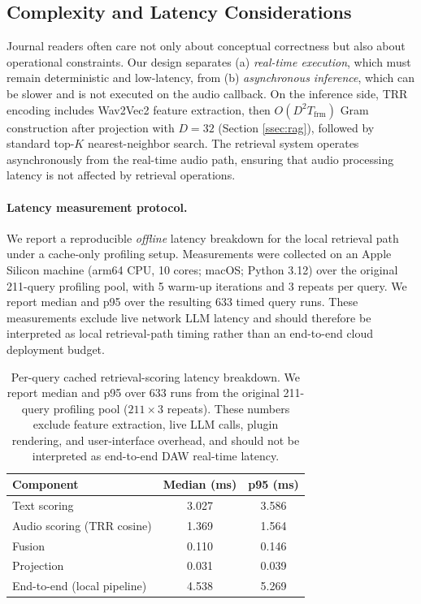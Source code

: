 \subsection{Complexity and Latency Considerations}
\label{ssec:complexity_latency}
Journal readers often care not only about conceptual correctness but also about operational constraints. Our design separates (a) \textit{real-time execution}, which must remain deterministic and low-latency, from (b) \textit{asynchronous inference}, which can be slower and is not executed on the audio callback.
On the inference side, TRR encoding includes Wav2Vec2 feature extraction, then $O(D^2 T_{\text{frm}})$ Gram construction after projection with $D=32$ (Section \ref{ssec:rag}), followed by standard top-$K$ nearest-neighbor search. The retrieval system operates asynchronously from the real-time audio path, ensuring that audio processing latency is not affected by retrieval operations.

\paragraph{Latency measurement protocol.}
We report a reproducible \emph{offline} latency breakdown for the local retrieval path under a cache-only profiling setup. Measurements were collected on an Apple Silicon machine (arm64 CPU, 10 cores; macOS; Python 3.12) over the original 211-query profiling pool, with 5 warm-up iterations and 3 repeats per query. We report median and p95 over the resulting 633 timed query runs. These measurements exclude live network LLM latency and should therefore be interpreted as local retrieval-path timing rather than an end-to-end cloud deployment budget.

\begin{table}[t]
	\centering
\caption{Per-query cached retrieval-scoring latency breakdown. We report median and p95 over 633 runs from the original 211-query profiling pool ($211\times 3$ repeats). These numbers exclude feature extraction, live LLM calls, plugin rendering, and user-interface overhead, and should not be interpreted as end-to-end DAW real-time latency.}
	\label{tab:latency_breakdown}
	\begin{tabular}{lcc}
		\toprule
		\textbf{Component} & \textbf{Median (ms)} & \textbf{p95 (ms)} \\
		\midrule
		Text scoring & 3.027 & 3.586 \\
		Audio scoring (TRR cosine) & 1.369 & 1.564 \\
		Fusion & 0.110 & 0.146 \\
		Projection & 0.031 & 0.039 \\
		End-to-end (local pipeline) & 4.538 & 5.269 \\
		\bottomrule
	\end{tabular}
\end{table}

